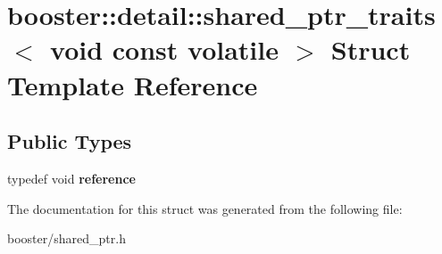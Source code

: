 \section{booster\+:\+:detail\+:\+:shared\+\_\+ptr\+\_\+traits$<$ void const volatile $>$ Struct Template Reference}
\label{structbooster_1_1detail_1_1shared__ptr__traits_3_01void_01const_01volatile_01_4}
\subsection*{Public Types}
\begin{DoxyCompactItemize}
\item 
typedef void {\bfseries reference}\label{structbooster_1_1detail_1_1shared__ptr__traits_3_01void_01const_01volatile_01_4_a604c7d14d2b29328f8ceb2485489b938}

\end{DoxyCompactItemize}


The documentation for this struct was generated from the following file\+:\begin{DoxyCompactItemize}
\item 
booster/shared\+\_\+ptr.\+h\end{DoxyCompactItemize}
